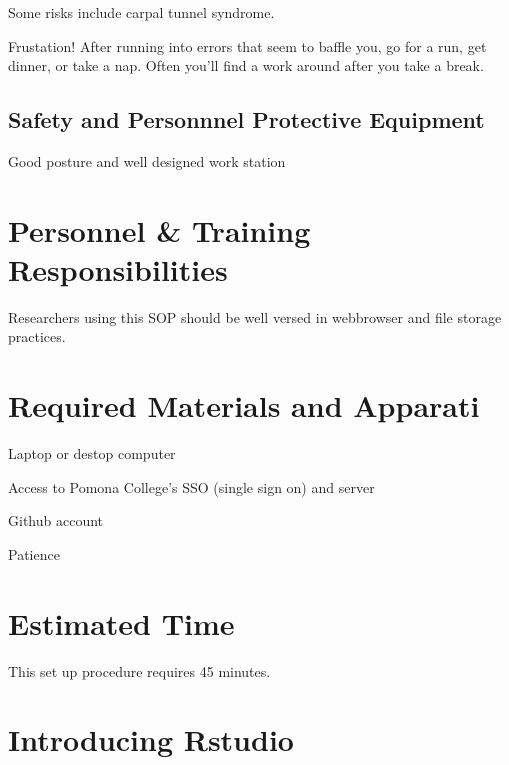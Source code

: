 \documentclass[12pt]{../SOP4_alpha}\usepackage[]{graphicx}\usepackage[]{color}
\begin{document}
\NP Some risks include carpal tunnel syndrome.

\NP Frustation!  After running into errors that seem to baffle you, go for a run, get dinner, or take a nap. Often you'll find a work around after you take a break. 


\subsection*{Safety and Personnnel Protective Equipment}

\NP Good posture and well designed work station

\section{Personnel \& Training Responsibilities}

\NP Researchers using this SOP should be well versed in webbrowser and file storage practices. 


\section{Required Materials and Apparati}

\NP Laptop or destop computer

\NP Access to Pomona College's SSO (single sign on) and server

\NP Github account

\NP Patience


\section{Estimated Time}

\NP This set up procedure requires 45 minutes.


\section{Introducing Rstudio}
\end{document}
